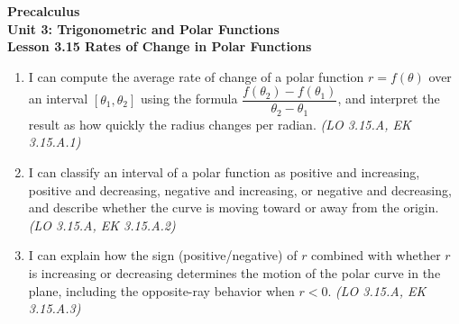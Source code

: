 \documentclass[10pt]{article}
\begin{document}
\vspace{-0.8in}

\begin{center}
  {\color{white}\textbf{\LARGE Precalculus}}\\[4pt]
  {\color{skymid}\large\textbf{Unit 3: Trigonometric and Polar Functions}}\\[6pt]
  {\color{white}\textbf{\large Lesson 3.15 \quad Rates of Change in Polar Functions}}
\end{center}

\vspace{0.22in}
\namedateperiod
\vspace{0.18in}

\begin{learningtargetbox}
\small
\begin{enumerate}[leftmargin=1.5em, itemsep=5pt]
  \item I can compute the average rate of change of a polar function $r = f(\theta)$
    over an interval $[\theta_1, \theta_2]$ using the formula
    $\dfrac{f(\theta_2)-f(\theta_1)}{\theta_2-\theta_1}$, and interpret the result
    as how quickly the radius changes per radian.
    \hfill\textit{(LO 3.15.A, EK 3.15.A.1)}
  \item I can classify an interval of a polar function as positive and increasing,
    positive and decreasing, negative and increasing, or negative and decreasing,
    and describe whether the curve is moving toward or away from the origin.
    \hfill\textit{(LO 3.15.A, EK 3.15.A.2)}
  \item I can explain how the sign (positive/negative) of $r$ combined with whether
    $r$ is increasing or decreasing determines the motion of the polar curve in the
    plane, including the opposite-ray behavior when $r < 0$.
    \hfill\textit{(LO 3.15.A, EK 3.15.A.3)}
\end{enumerate}
\end{learningtargetbox}

\vspace{0.14in}
\end{document}
